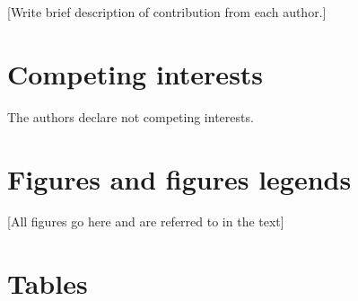 \documentclass[english]{article}
\begin{document}
[Write brief description of contribution from each author.]

\section*{Competing interests}


The authors declare not competing interests.

\section*{Figures and figures legends}



[All figures go here and are referred to in the text]

\section*{Tables}

\end{document}
